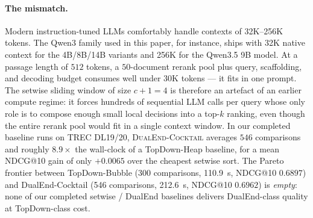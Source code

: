 \paragraph{The mismatch.} Modern instruction-tuned LLMs comfortably handle
contexts of 32K--256K tokens. The Qwen3 family used in this paper, for
instance, ships with 32K native context for the 4B/8B/14B variants and 256K
for the Qwen3.5 9B model. At a passage length of $512$ tokens, a $50$-document
rerank pool plus query, scaffolding, and decoding budget consumes well under
$30\mathrm{K}$ tokens --- it fits in one prompt. The setwise sliding window of
size $c{+}1{=}4$ is therefore an artefact of an earlier compute regime: it
forces hundreds of sequential LLM calls per query whose only role is to
compose enough small local decisions into a top-$k$ ranking, even though the
entire rerank pool would fit in a single context window. In our completed
baseline runs on TREC DL19/20, \textsc{DualEnd-Cocktail} averages $546$
comparisons and roughly $8.9{\times}$ the wall-clock of a TopDown-Heap
baseline, for a mean NDCG@10 gain of only $+0.0065$ over the cheapest setwise
sort. The Pareto frontier between TopDown-Bubble (300 comparisons, 110.9~s,
NDCG@10 $0.6897$) and DualEnd-Cocktail (546 comparisons, 212.6~s, NDCG@10
$0.6962$) is \emph{empty}: none of our completed setwise / DualEnd baselines
delivers DualEnd-class quality at TopDown-class cost.

